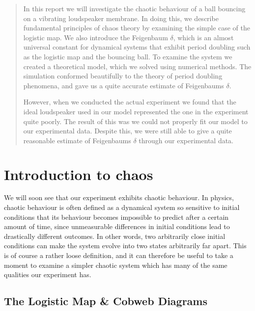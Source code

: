 \documentclass[12pt,oneside,a4paper]{article}
\numberwithin{equation}{section}
\begin{document}
{{{{\begin{abstract}
\end{abstract}

\begin{abstract}
\setlength{\parindent}{0cm}
\setlength{\parskip}{0.3cm}
\noindent In this report we will investigate the chaotic behaviour of a ball 
bouncing on a vibrating loudspeaker membrane. In doing this, we describe 
fundamental principles of chaos theory by examining the simple case of the 
logistic map. We also introduce the Feigenbaum $\delta$, which is an almost 
universal constant for dynamical systems that exhibit period doubling such as 
the logistic map and the bouncing ball. To examine the system we created a 
theoretical model, which we solved using numerical methods. The simulation 
conformed beautifully to the theory of period doubling phenomena, and gave us a 
quite accurate estimate of Feigenbaums $\delta$.

However, when we conducted the actual experiment we found that the ideal loudspeaker used in our model represented the one in the experiment quite poorly. The result of this was we could not properly fit our model to our experimental data. Despite this, we were still able to give a quite reasonable estimate of Feigenbaums $\delta$ through our experimental data.
\end{abstract}

\newpage

\tableofcontents


\newpage
{}
\section{Introduction to chaos}
\label{chaos}
We will soon see that our experiment exhibits chaotic behaviour. In physics, 
chaotic behaviour is often defined as a dynamical system so sensitive to 
initial conditions that its behaviour becomes impossible to predict after a 
certain amount of time, since unmeasurable differences in initial conditions 
lead to drastically different outcomes. In other words, two arbitrarily close 
initial conditions can make the system evolve into two states arbitrarily far 
apart. This is of course a rather loose definition, and it can therefore be 
useful to take a moment to examine a simpler chaotic system which has many of 
the same qualities our experiment has.

\subsection{The Logistic Map \& Cobweb Diagrams}

}}}}
\end{document}
